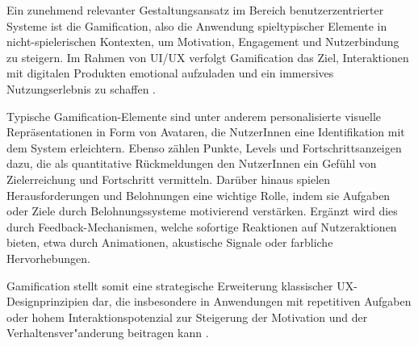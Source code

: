 Ein zunehmend relevanter Gestaltungsansatz im Bereich benutzerzentrierter Systeme ist die Gamification, also die Anwendung spieltypischer Elemente in nicht-spielerischen Kontexten, um Motivation, Engagement und Nutzerbindung zu steigern. Im Rahmen von UI/UX verfolgt Gamification das Ziel, Interaktionen mit digitalen Produkten emotional aufzuladen und ein immersives Nutzungserlebnis zu schaffen \cite{Deterding2011}.

Typische Gamification-Elemente sind unter anderem personalisierte visuelle Repräsentationen in Form von Avataren, die NutzerInnen eine Identifikation mit dem System erleichtern. Ebenso zählen Punkte, Levels und Fortschrittsanzeigen dazu, die als quantitative Rückmeldungen den NutzerInnen ein Gefühl von Zielerreichung und Fortschritt vermitteln. Darüber hinaus spielen Herausforderungen und Belohnungen eine wichtige Rolle, indem sie Aufgaben oder Ziele durch Belohnungssysteme motivierend verstärken. Ergänzt wird dies durch Feedback-Mechanismen, welche sofortige Reaktionen auf Nutzeraktionen bieten, etwa durch Animationen, akustische Signale oder farbliche Hervorhebungen\cite{Werbach2012, Deterding2011}.

Gamification stellt somit eine strategische Erweiterung klassischer UX-Designprinzipien dar, die insbesondere in Anwendungen mit repetitiven Aufgaben oder hohem Interaktionspotenzial zur Steigerung der Motivation und der Verhaltensver"anderung beitragen kann \cite{Deterding2011}.